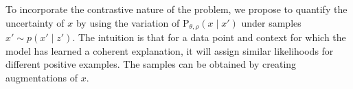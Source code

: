 \documentclass[tablecaption=bottom,wcp]{jmlr} %
\begin{document}
\begin{table}
\centering
  \caption{Test accuracies for different unsupervised methods on the citation datasets. Our proposed method outperforms all the baselines on all tasks.}
  \label{tab:acc_table}
\end{table}

To incorporate the contrastive nature of the problem, we propose to quantify the uncertainty of $x$ by using the variation of $\mathrm{P}_{\theta, \rho}(x\mid x')$  under samples $x' \sim p(x' \mid z')$. The intuition is that for a data point and context for which the model has learned a coherent explanation, it will assign similar likelihoods for different positive examples. The samples can be obtained by creating augmentations of $x$.
\end{document}

